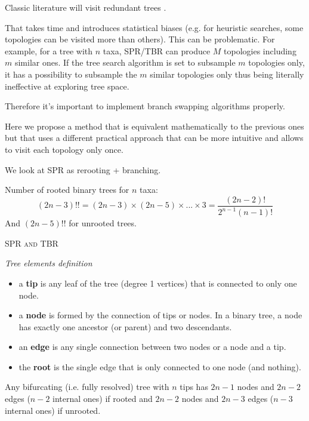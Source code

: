 \documentclass[12pt,letterpaper]{article}
\renewcommand{\section}[1]{%
\bigskip
\begin{center}
\begin{Large}
\normalfont\scshape #1
\medskip
\end{Large}
\end{center}}
\renewcommand{\subsection}[1]{%
\bigskip
\begin{center}
\begin{large}
\normalfont\itshape #1
\end{large}
\end{center}}
\begin{document}
Classic literature will visit redundant trees \citep{felsenstein2004inferring}.

That takes time and introduces statistical biases (e.g. for heuristic searches, some topologies can be visited more than others).
This can be problematic. For example, for a tree with $n$ taxa, SPR/TBR can produce $M$ topologies including $m$ similar ones.
If the tree search algorithm is set to subsample $m$ topologies only, it has a possibility to subsample the $m$ similar topologies only thus being literally ineffective at exploring tree space.


Therefore it's important to implement branch swapping algorithms properly.

Here we propose a method that is equivalent mathematically to the previous ones \citep{felsenstein2004inferring} but that uses a different practical approach that can be more intuitive and allows to visit each topology only once.

We look at SPR as rerooting + branching.

Number of rooted binary trees for $n$ taxa:
\begin{equation}
(2n-3)!!=(2n-3)\times(2n-5)\times...\times3=\frac{(2n-2)!}{2^{n-1}(n-1)!}
\end{equation}
And $(2n-5)!!$ for unrooted trees.


\section{SPR and TBR}

\subsection{Tree elements definition}
\begin{itemize}
    \item a \textbf{tip} is any leaf of the tree (degree 1 vertices) that is connected to only one node.
    \item a \textbf{node} is formed by the connection of tips or nodes. In a binary tree, a node has exactly one ancestor (or parent) and two descendants.
    \item an \textbf{edge} is any single connection between two nodes or a node and a tip.
    \item the \textbf{root} is the single edge that is only connected to one node (and nothing).
\end{itemize}
Any bifurcating (i.e. fully resolved) tree with $n$ tips has $2n-1$ nodes and $2n-2$ edges ($n-2$ internal ones) if rooted and $2n-2$ nodes and $2n-3$ edges ($n-3$ internal ones) if unrooted.
\end{document}
